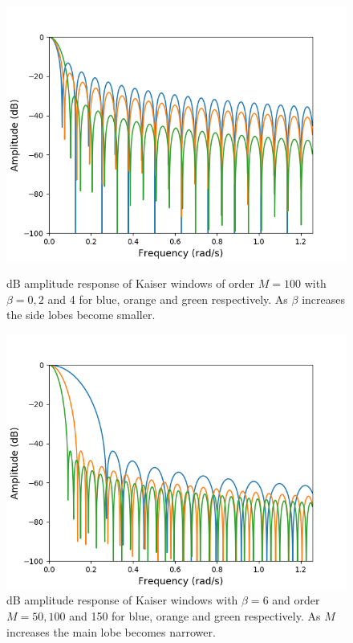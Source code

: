 \begin{figure}[H]
\centering
\begin{minipage}{0.49\textwidth}
\centering
\includegraphics[width=\textwidth]{figures/dbplots/kaiser_beta.png}
\caption{dB amplitude response of Kaiser windows of order $M=100$ with $\beta=0,2$ and 4 for blue, orange and green respectively. As $\beta$ increases the side lobes become smaller.}
\label{fig:kaiser_beta}
\end{minipage}
\begin{minipage}{0.49\textwidth}
\centering
\includegraphics[width=\textwidth]{figures/dbplots/kaiser_order.png}
\caption{dB amplitude response of Kaiser windows with $\beta=6$ and order $M=50,100$ and 150 for blue, orange and green respectively. As $M$ increases the main lobe becomes narrower.}
\label{fig:kaiser_order}
\end{minipage}
\end{figure}
 

